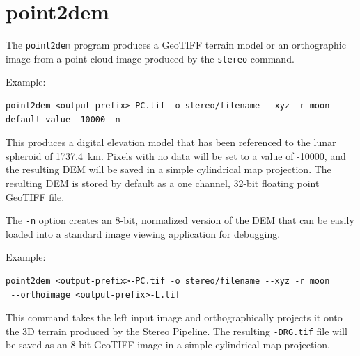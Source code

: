 
\section{point2dem}
\label{point2dem}

The \texttt{point2dem} program produces a GeoTIFF terrain model or an orthographic image from a point cloud image produced by the {\tt stereo} command.

Example:
\begin{verbatim}
point2dem <output-prefix>-PC.tif -o stereo/filename --xyz -r moon --default-value -10000 -n
\end{verbatim}

This produces a digital elevation model that has been referenced to
the lunar spheroid of 1737.4~km.  Pixels with no data will be set to a
value of -10000, and the resulting DEM will be saved in a simple
cylindrical map projection.  The resulting DEM is stored by default as
a one channel, 32-bit floating point GeoTIFF file.

The {\tt -n} option creates an 8-bit, normalized version of the DEM
that can be easily loaded into a standard image viewing application
for debugging.

Example:
\begin{verbatim}
point2dem <output-prefix>-PC.tif -o stereo/filename --xyz -r moon
 --orthoimage <output-prefix>-L.tif
\end{verbatim}

This command takes the left input image and orthographically projects
it onto the 3D terrain produced by the Stereo Pipeline.  The resulting
{\tt *-DRG.tif} file will be saved as an 8-bit GeoTIFF image in a
simple cylindrical map projection.

